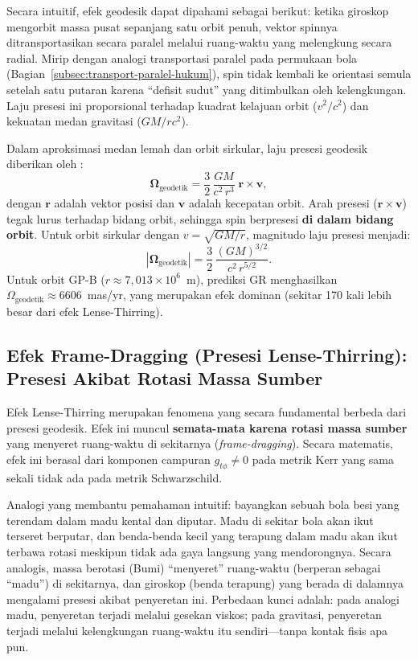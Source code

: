 Secara intuitif, efek geodesik dapat dipahami sebagai berikut: ketika giroskop mengorbit massa pusat sepanjang satu orbit penuh, vektor spinnya ditransportasikan secara paralel melalui ruang-waktu yang melengkung secara radial. Mirip dengan analogi transportasi paralel pada permukaan bola (Bagian~\ref{subsec:transport-paralel-hukum}), spin tidak kembali ke orientasi semula setelah satu putaran karena ``defisit sudut'' yang ditimbulkan oleh kelengkungan. Laju presesi ini proporsional terhadap kuadrat kelajuan orbit ($v^2/c^2$) dan kekuatan medan gravitasi ($GM/rc^2$).

Dalam aproksimasi medan lemah dan orbit sirkular, laju presesi geodesik diberikan oleh \parencite{Will2014Confrontation}:
\begin{equation}
    \bm{\Omega}_{\text{geodetik}} = \frac{3}{2}\,\frac{GM}{c^2\,r^3}\; \mathbf{r} \times \mathbf{v},
    \label{eq:omega-geodetic}
\end{equation}
dengan $\mathbf{r}$ adalah vektor posisi dan $\mathbf{v}$ adalah kecepatan orbit. Arah presesi ($\mathbf{r} \times \mathbf{v}$) tegak lurus terhadap bidang orbit, sehingga spin berpresesi \textbf{di dalam bidang orbit}. Untuk orbit sirkular dengan $v = \sqrt{GM/r}$, magnitudo laju presesi menjadi:
\begin{equation}
    |\bm{\Omega}_{\text{geodetik}}| = \frac{3}{2}\,\frac{(GM)^{3/2}}{c^2\, r^{5/2}}.
    \label{eq:omega-geodetic-circular}
\end{equation}
Untuk orbit GP-B ($r \approx 7{,}013 \times 10^6$~m), prediksi GR menghasilkan $\Omega_{\text{geodetik}} \approx 6606$~mas/yr, yang merupakan efek dominan (sekitar 170 kali lebih besar dari efek Lense-Thirring).


\subsection{Efek Frame-Dragging (Presesi Lense-Thirring): Presesi Akibat Rotasi Massa Sumber}
\label{subsec:frame-dragging}

Efek Lense-Thirring merupakan fenomena yang secara fundamental berbeda dari presesi geodesik. Efek ini muncul \textbf{semata-mata karena rotasi massa sumber} yang menyeret ruang-waktu di sekitarnya (\textit{frame-dragging}). Secara matematis, efek ini berasal dari komponen campuran $g_{t\phi} \neq 0$ pada metrik Kerr yang sama sekali tidak ada pada metrik Schwarzschild.

Analogi yang membantu pemahaman intuitif: bayangkan sebuah bola besi yang terendam dalam madu kental dan diputar. Madu di sekitar bola akan ikut terseret berputar, dan benda-benda kecil yang terapung dalam madu akan ikut terbawa rotasi meskipun tidak ada gaya langsung yang mendorongnya. Secara analogis, massa berotasi (Bumi) ``menyeret'' ruang-waktu (berperan sebagai ``madu'') di sekitarnya, dan giroskop (benda terapung) yang berada di dalamnya mengalami presesi akibat penyeretan ini. Perbedaan kunci adalah: pada analogi madu, penyeretan terjadi melalui gesekan viskos; pada gravitasi, penyeretan terjadi melalui kelengkungan ruang-waktu itu sendiri---tanpa kontak fisis apa pun.


